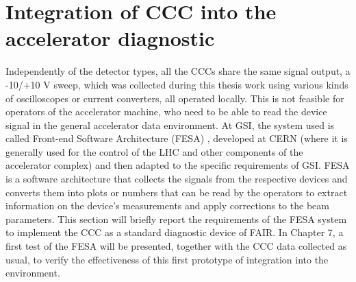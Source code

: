 \documentclass[12pt,a4paper]{report}
\begin{document}
       \section{Integration of CCC into the accelerator diagnostic}
       Independently of the detector types, all the CCCs share the same signal output, a -10/+10 V sweep, which was collected during this thesis work using various kinds of oscilloscopes or current converters, all operated locally. This is not feasible for operators of the accelerator machine, who need to be able to read the device signal in the general accelerator data environment. At GSI, the system used is called Front-end Software Architecture (FESA) \cite{FESA_Class}, developed at CERN (where it is generally used for the control of the LHC and other components of the accelerator complex) and then adapted to the specific requirements of GSI. FESA is a software architecture that collects the signals from the respective devices and converts them into plots or numbers that can be read by the operators to extract information on the device's measurements and apply corrections to the beam parameters. This section will briefly report the requirements of the FESA system to implement the CCC as a standard diagnostic device of FAIR. In Chapter 7, a first test of the FESA will be presented, together with the CCC data collected as usual, to verify the effectiveness of this first prototype of integration into the environment.
       
\end{document}
